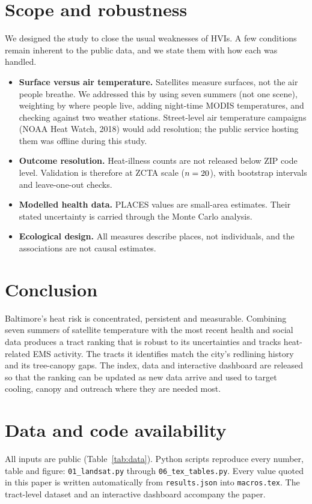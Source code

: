 \documentclass[11pt]{article}
\begin{document}
\section{Scope and robustness}
We designed the study to close the usual weaknesses of HVIs. A few conditions remain inherent to the public data, and we state them with how each was handled.
\begin{itemize}
  \item \textbf{Surface versus air temperature.} Satellites measure surfaces, not the air people breathe. We addressed this by using seven summers (not one scene), weighting by where people live, adding night-time MODIS temperatures, and checking against two weather stations. Street-level air temperature campaigns (NOAA Heat Watch, 2018) would add resolution; the public service hosting them was offline during this study.
  \item \textbf{Outcome resolution.} Heat-illness counts are not released below ZIP code level. Validation is therefore at ZCTA scale ($n=20$), with bootstrap intervals and leave-one-out checks.
  \item \textbf{Modelled health data.} PLACES values are small-area estimates. Their stated uncertainty is carried through the Monte Carlo analysis.
  \item \textbf{Ecological design.} All measures describe places, not individuals, and the associations are not causal estimates.
\end{itemize}

\section{Conclusion}
Baltimore's heat risk is concentrated, persistent and measurable. Combining seven summers of satellite temperature with the most recent health and social data produces a tract ranking that is robust to its uncertainties and tracks heat-related EMS activity. The tracts it identifies match the city's redlining history and its tree-canopy gaps. The index, data and interactive dashboard are released so that the ranking can be updated as new data arrive and used to target cooling, canopy and outreach where they are needed most.

\section*{Data and code availability}
All inputs are public (Table~\ref{tab:data}). Python scripts reproduce every number, table and figure: \texttt{01\_landsat.py} through \texttt{06\_tex\_tables.py}. Every value quoted in this paper is written automatically from \texttt{results.json} into \texttt{macros.tex}. The tract-level dataset and an interactive dashboard accompany the paper.
\end{document}
